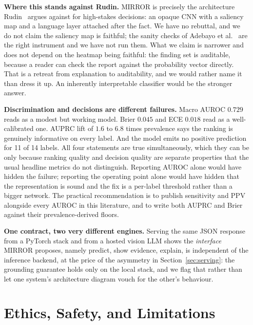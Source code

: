 \documentclass[conference]{IEEEtran}
\newcommand{\rih}[1]{\textbf{#1}\enspace\ignorespaces}
\begin{document}
\rih{Where this stands against Rudin.} MIRROR is precisely the architecture
Rudin~\cite{rudin2019stop} argues against for high-stakes decisions: an opaque CNN
with a saliency map and a language layer attached after the fact. We have no
rebuttal, and we do not claim the saliency map is faithful; the sanity checks of
Adebayo et al.~\cite{adebayo2018sanity} are the right instrument and we have not run
them. What we claim is narrower and does not depend on the heatmap being faithful:
the finding set is auditable, because a reader can check the report against the
probability vector directly. That is a retreat from explanation to auditability, and
we would rather name it than dress it up. An inherently interpretable classifier
would be the stronger answer.

\rih{Discrimination and decisions are different failures.} Macro AUROC $0.729$ reads
as a modest but working model. Brier $0.045$ and ECE $0.018$ read as a
well-calibrated one. AUPRC lift of $1.6$ to $6.8$ times prevalence says the ranking
is genuinely informative on every label. And the model emits no positive prediction
for 11 of 14 labels. All four statements are true simultaneously, which they can be
only because ranking quality and decision quality are separate properties that the
usual headline metrics do not distinguish. Reporting AUROC alone would have hidden
the failure; reporting the operating point alone would have hidden that the
representation is sound and the fix is a per-label threshold rather than a bigger
network. The practical recommendation is to publish sensitivity and PPV alongside
every AUROC in this literature, and to write both AUPRC and Brier against their
prevalence-derived floors.

\rih{One contract, two very different engines.} Serving the same JSON response from
a PyTorch stack and from a hosted vision LLM shows the \emph{interface} MIRROR
proposes, namely predict, show evidence, explain, is independent of the inference
backend, at the price of the asymmetry in Section~\ref{sec:serving}: the grounding
guarantee holds only on the local stack, and we flag that rather than let one
system's architecture diagram vouch for the other's behaviour.

\section{Ethics, Safety, and Limitations}
\label{sec:ethics}
\end{document}
